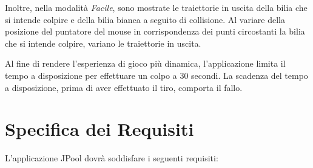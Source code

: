 \documentclass[12pt,a4paper]{report}
\begin{document}
Inoltre, nella modalità \emph{Facile}, sono mostrate le traiettorie in uscita della bilia che si intende colpire e della bilia bianca a seguito di collisione.
Al variare della posizione del puntatore del mouse in corrispondenza dei punti circostanti la bilia che si intende colpire, variano le traiettorie in uscita. 

\vspace{3mm}

Al fine di rendere l'esperienza di gioco più dinamica, l'applicazione limita il tempo a disposizione per effettuare un colpo a 30 secondi.
La scadenza del tempo a disposizione, prima di aver effettuato il tiro, comporta il fallo.

\chapter{Specifica dei Requisiti}\label{ch:Specifications} %
L'applicazione JPool dovrà soddisfare i seguenti requisiti:
\end{document}

